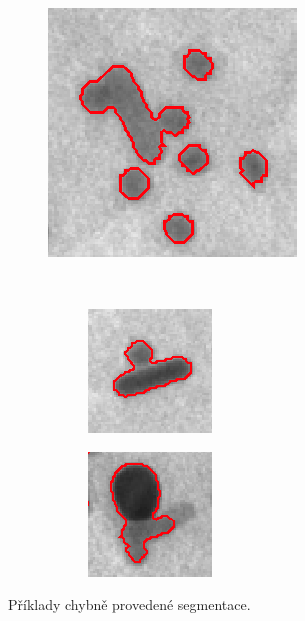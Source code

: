 \documentclass[11pt,twoside,a4paper,table]{book}
\begin{document}
\begin{figure}[ht]
	\begin{center}
	\begin{subfigure}[l]{0.45\textwidth}
		\includegraphics[scale=1]{figures/segment_problem1.png}
	\end{subfigure}
	~
	\begin{subfigure}[r]{0.45\textwidth}
		\begin{subfigure}[b]{\textwidth}
			\includegraphics[scale=1]{figures/segment_problem2.png}
		\end{subfigure}
	
		\begin{subfigure}[b]{\textwidth}
			\includegraphics[scale=1]{figures/segment_problem3.png}
		\end{subfigure}
	\end{subfigure}
	\end{center}
	\caption{Příklady chybně provedené segmentace.}
	\label{fig:segment_problems}
\end{figure}
\end{document}
